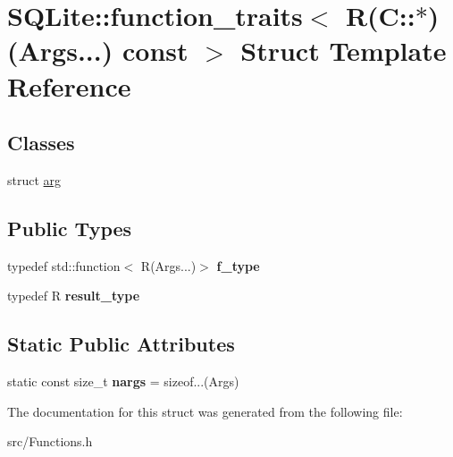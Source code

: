 \hypertarget{struct_s_q_lite_1_1function__traits_3_01_r_07_c_1_1_5_08_07_args_8_8_8_08_01const_01_01_4}{\section{S\-Q\-Lite\-:\-:function\-\_\-traits$<$ R(C\-:\-:$\ast$)(Args...) const $>$ Struct Template Reference}
\label{struct_s_q_lite_1_1function__traits_3_01_r_07_c_1_1_5_08_07_args_8_8_8_08_01const_01_01_4}
}
\subsection*{Classes}
\begin{DoxyCompactItemize}
\item 
struct \hyperlink{struct_s_q_lite_1_1function__traits_3_01_r_07_c_1_1_5_08_07_args_8_8_8_08_01const_01_01_4_1_1arg}{arg}
\end{DoxyCompactItemize}
\subsection*{Public Types}
\begin{DoxyCompactItemize}
\item 
\hypertarget{struct_s_q_lite_1_1function__traits_3_01_r_07_c_1_1_5_08_07_args_8_8_8_08_01const_01_01_4_a94a8a7aead0412d73a03e2f6f97f628d}{typedef std\-::function$<$ R(Args...)$>$ {\bfseries f\-\_\-type}}\label{struct_s_q_lite_1_1function__traits_3_01_r_07_c_1_1_5_08_07_args_8_8_8_08_01const_01_01_4_a94a8a7aead0412d73a03e2f6f97f628d}

\item 
\hypertarget{struct_s_q_lite_1_1function__traits_3_01_r_07_c_1_1_5_08_07_args_8_8_8_08_01const_01_01_4_abd8ad43b029985269496f0fb2166d690}{typedef R {\bfseries result\-\_\-type}}\label{struct_s_q_lite_1_1function__traits_3_01_r_07_c_1_1_5_08_07_args_8_8_8_08_01const_01_01_4_abd8ad43b029985269496f0fb2166d690}

\end{DoxyCompactItemize}
\subsection*{Static Public Attributes}
\begin{DoxyCompactItemize}
\item 
\hypertarget{struct_s_q_lite_1_1function__traits_3_01_r_07_c_1_1_5_08_07_args_8_8_8_08_01const_01_01_4_a72dae0c2818d49446c007795e9aadc35}{static const size\-\_\-t {\bfseries nargs} = sizeof...(Args)}\label{struct_s_q_lite_1_1function__traits_3_01_r_07_c_1_1_5_08_07_args_8_8_8_08_01const_01_01_4_a72dae0c2818d49446c007795e9aadc35}

\end{DoxyCompactItemize}


The documentation for this struct was generated from the following file\-:\begin{DoxyCompactItemize}
\item 
src/Functions.\-h\end{DoxyCompactItemize}
